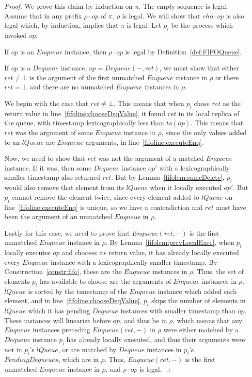 \documentclass[a4paper,anonymous,USenglish]{lipics-v2021} %
\theoremstyle{definition}
\begin{document}
\begin{proof}
  We prove this claim by induction on $\pi$.  The empty sequence is legal.  Assume that in any prefix $\rho \cdot op$ of $\pi$, $\rho$ is legal.  We will show that $rho \cdot op$ is also legal which, by induction, implies that $\pi$ is legal.  Let $p_i$ be the process which invoked $op$.

  If $op$ is an $Enqueue$ instance, then $\rho \cdot op$ is legal by Definition~\ref{def:FIFOQueue}.

  If $op$ is a $Dequeue$ instance, $op = Dequeue(-,ret)$, we must show that either $ret \neq \bot$ is the argument of the first unmatched $Enqueue$ instance in $\rho$ or there $ret = \bot$ and there are no unmatched $Enqueue$ instances in $\rho$.

  We begin with the case that $ret \neq \bot$.  This means that when $p_i$ chose $ret$ as the return value in line~\ref{fifoline:chooseDeqValue}, it found $ret$ in its local replica of the queue, with timestamp lexicographically less than $ts(op)$.  This means that $ret$ was the argument of some $Enqueue$ instance in $\rho$, since the only values added to an $lQueue$ are $Enqueue$ arguments, in line~\ref{fifoline:executeEnq}.

  Now, we need to show that $ret$ was not the argument of a matched $Enqueue$ instance.  If it was, then some $Dequeue$ instance $op'$ with a lexicographically smaller timestamp also returned $ret$.  But by Lemma~\ref{fifolem:sameDelete}, $p_i$ would also remove that element from its $lQueue$ when it locally executed $op'$.  But $p_i$ cannot remove the element twice, since every element added to $lQueue$ on line~\ref{fifoline:executeEnq} is unique, so we have a contradiction and $ret$ must have been the argument of an unmatched $Enqueue$ in $\rho$.

  Lastly for this case, we need to prove that $Enqueue(ret,-)$ is the first unmatched $Enqueue$ instance in $\rho$.  By Lemma~\ref{fifolem:prevLocalExec}, when $p_i$ locally executes $op$ and chooses its return value, it has already locally executed every $Enqueue$ instance with a lexicographically smaller timestamp.  By Construction~\ref{constr:fifo}, these are the $Enqueue$ instances in $\rho$.  Thus, the set of elements $p_i$ has available to choose are the arguments of $Enqueue$ instances in $\rho$.  $lQueue$ is sorted by the timestamp of the $Enqueue$ instance which added each element, and in line~\ref{fifoline:chooseDeqValue}, $p_i$ skips the number of elements in $lQueue$ which it has pending $Dequeue$ instances with smaller timestamp than $op$.  These instances will linearize before $op$, and thus be in $\rho$, which means that any $Enqueue$ instances preceding $Enqueue(ret,-)$ in $\rho$ were either matched by a $Dequeue$ instance $p_i$ has already locally executed, and thus their arguments were not in $p_i$'s $lQueue$, or are matched by $Dequeue$ instances in $p_i$'s $PendingDequeues$, which are in $\rho$.  Thus, $Enqueue(ret,-)$ is the first unmatched $Enqueue$ instance in $\rho$, and $\rho \cdot op$ is legal.


\end{proof}
\end{document}
